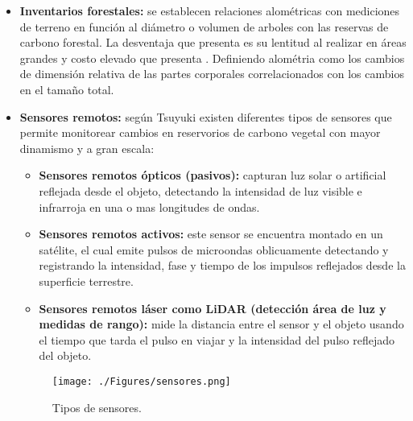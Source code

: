 \begin{itemize}
	
	\item \textbf{Inventarios forestales:} se establecen relaciones alom\'etricas con mediciones de terreno en funci\'on al di\'ametro o volumen de arboles con las reservas de carbono forestal. La desventaja que presenta es su lentitud al realizar en \'areas grandes y costo elevado que presenta \cite{asner2005selective}. Definiendo alom\'etria como los cambios de dimensi\'on relativa de las partes corporales correlacionados con los cambios en el tama\~{n}o total. 
	\item \textbf{Sensores remotos:} seg\'un Tsuyuki \cite{libro2012Tsuyuki} existen diferentes tipos de sensores que permite monitorear cambios en reservorios de carbono vegetal con mayor dinamismo y a gran escala:
	\begin{itemize}
	\item \textbf{Sensores remotos \'opticos (pasivos):} capturan luz solar o artificial reflejada desde el objeto, detectando la intensidad de luz visible e infrarroja en una o mas longitudes de ondas.
	\item  \textbf{Sensores remotos activos:} este sensor se encuentra montado en un sat\'elite, el cual emite pulsos de microondas oblicuamente detectando y registrando la intensidad, fase y tiempo de los impulsos reflejados desde la superficie terrestre.
	\item  \textbf{Sensores remotos l\'aser como LiDAR (detecci\'on \'area de luz y medidas de rango):} mide la distancia entre el sensor y el objeto usando el tiempo que tarda el pulso en viajar y la intensidad del pulso reflejado del objeto.
	\end{itemize}
	    \begin{figure}[!hbtp]
	    	\centering
	    	\texttt{[image: ./Figures/sensores.png]}
	    	\caption{Tipos de sensores.}
	    	\label{fig:sensores}
	    \end{figure}
\end{itemize}

